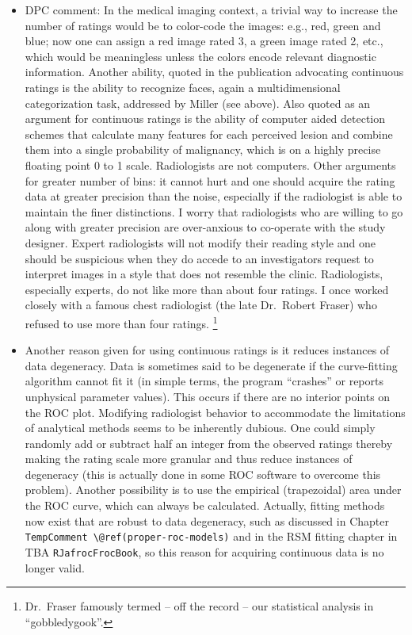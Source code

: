 \documentclass[
]{book}
\begin{document}
\begin{itemize}
\item
  DPC comment: In the medical imaging context, a trivial way to increase the number of ratings would be to color-code the images: e.g., red, green and blue; now one can assign a red image rated 3, a green image rated 2, etc., which would be meaningless unless the colors encode relevant diagnostic information. Another ability, quoted in the publication \citep{wagner2001continuous} advocating continuous ratings is the ability to recognize faces, again a multidimensional categorization task, addressed by Miller (see above). Also quoted as an argument for continuous ratings is the ability of computer aided detection schemes that calculate many features for each perceived lesion and combine them into a single probability of malignancy, which is on a highly precise floating point 0 to 1 scale. Radiologists are not computers. Other arguments for greater number of bins: it cannot hurt and one should acquire the rating data at greater precision than the noise, especially if the radiologist is able to maintain the finer distinctions. I worry that radiologists who are willing to go along with greater precision are over-anxious to co-operate with the study designer. Expert radiologists will not modify their reading style and one should be suspicious when they do accede to an investigators request to interpret images in a style that does not resemble the clinic. Radiologists, especially experts, do not like more than about four ratings. I once worked closely with a famous chest radiologist (the late Dr.~Robert Fraser) who refused to use more than four ratings. \footnote{Dr.~Fraser famously termed -- off the record -- our statistical analysis in \citep{Chakraborty1986DigitalVsConv} ``gobbledygook''.}
\item
  Another reason given for using continuous ratings is it reduces instances of data degeneracy. Data is sometimes said to be degenerate if the curve-fitting algorithm cannot fit it (in simple terms, the program ``crashes'' or reports unphysical parameter values). This occurs if there are no interior points on the ROC plot. Modifying radiologist behavior to accommodate the limitations of analytical methods seems to be inherently dubious. One could simply randomly add or subtract half an integer from the observed ratings thereby making the rating scale more granular and thus reduce instances of degeneracy (this is actually done in some ROC software to overcome this problem). Another possibility is to use the empirical (trapezoidal) area under the ROC curve, which can always be calculated. Actually, fitting methods now exist that are robust to data degeneracy, such as discussed in Chapter \texttt{TempComment\ \textbackslash{}@ref(proper-roc-models)} and in the RSM fitting chapter in TBA \texttt{RJafrocFrocBook}, so this reason for acquiring continuous data is no longer valid.

\end{itemize}
\end{document}
